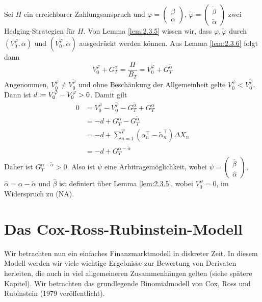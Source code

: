 \documentclass[a4paper,twoside,DIV15,BCOR12mm]{scrbook}
\begin{document}
\begin{beweis}
Sei $H$ ein erreichbarer Zahlungsanspruch und $\varphi =
\left(\begin{smallmatrix} \beta \\ \alpha \end{smallmatrix}\right)$, $\tilde\varphi =
\left(\begin{smallmatrix} \tilde\beta \\ \tilde\alpha \end{smallmatrix}\right)$ zwei Hedging-Strategien für $H$. Von Lemma \ref{lem:2.3.5} wissen wir, dass $\varphi, \tilde\varphi$ durch $(V_0^\varphi,\alpha)$ und $(V_0^{\tilde\varphi},\tilde\alpha)$ ausgedrückt werden können. Aus Lemma \ref{lem:2.3.6} folgt dann
\[
V_0^\varphi + G_T^\alpha = \frac H {B_T} = V_0^{\tilde\varphi} + G_T^{\tilde\alpha}
\]
Angenommen, $V_0^\varphi \ne V_0^{\tilde\varphi}$ und ohne Beschänkung der Allgemeinheit gelte $V_0^\varphi < V_0^{\tilde\varphi}$. Dann ist $d \da V_0^{\tilde{\varphi}} - V_0^{\varphi} > 0$. Damit gilt
\begin{align*}
0 &= V_0^\varphi - V_0^{\tilde\varphi} - G_T^{\tilde\alpha} + G_T^\alpha  \\
&= -d + G_T^\alpha  - G_T^{\tilde\alpha}  \\
&= -d + \sum_{n=1}^T (\alpha_n^\top - \tilde\alpha_n^\top) \Delta X_n \\
&= -d + G_T^{\alpha-\tilde\alpha}
\end{align*}
Daher ist $G_T^{\alpha-\tilde\alpha}>0$. Also ist $\psi$ eine Arbitragemöglichkeit, wobei $\psi = 
\left(\begin{smallmatrix} \hat\beta \\ \hat\alpha \end{smallmatrix}\right)$, $\hat\alpha = \alpha -\tilde\alpha$ und $\hat\beta$ ist definiert über Lemma \ref{lem:2.3.5}, wobei $V_0^\psi=0$, im Widerspruch zu (NA).
\end{beweis}

\section{Das Cox-Ross-Rubinstein-Modell}

Wir betrachten nun ein einfaches  Finanzmarktmodell in diskreter Zeit. In diesem Modell werden wir viele wichtige Ergebnisse zur Bewertung von Derivaten herleiten, die auch in viel allgemeineren Zusammenhängen gelten (siehe spätere Kapitel). Wir betrachten das grundlegende Binomialmodell von Cox, Ross und Rubinstein (1979 veröffentlicht).
\end{document}

